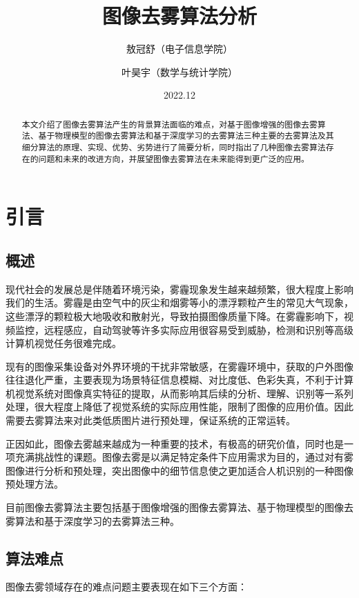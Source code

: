 \documentclass[12pt]{article}
\begin{document}
\title
{\bf\Large 图像去雾算法分析}
\date{\small 2022.12}
\author{\small 敖冠舒（电子信息学院） \and \small 叶昊宇（数学与统计学院）}
\maketitle

\thispagestyle{fancy}  

\begin{abstract}
本文介绍了图像去雾算法产生的背景算法面临的难点，对基于图像增强的图像去雾算法、基于物理模型的图像去雾算法和基于深度学习的去雾算法三种主要的去雾算法及其细分算法的原理、实现、优势、劣势进行了简要分析，同时指出了几种图像去雾算法存在的问题和未来的改进方向，并展望图像去雾算法在未来能得到更广泛的应用。
\end{abstract}

\section{引言}
\subsection{概述}

现代社会的发展总是伴随着环境污染，雾霾现象发生越来越频繁，很大程度上影响我们的生活。雾霾是由空气中的灰尘和烟雾等小的漂浮颗粒产生的常见大气现象，这些漂浮的颗粒极大地吸收和散射光，导致拍摄图像质量下降。在雾霾影响下，视频监控，远程感应，自动驾驶等许多实际应用很容易受到威胁，检测和识别等高级计算机视觉任务很难完成。

现有的图像采集设备对外界环境的干扰非常敏感，在雾霾环境中，获取的户外图像往往退化严重，主要表现为场景特征信息模糊、对比度低、色彩失真，不利于计算机视觉系统对图像真实特征的提取，从而影响其后续的分析、理解、识别等一系列处理，很大程度上降低了视觉系统的实际应用性能，限制了图像的应用价值。因此需要去雾算法来对此类低质图片进行预处理，保证系统的正常运转。

正因如此，图像去雾越来越成为一种重要的技术，有极高的研究价值，同时也是一项充满挑战性的课题。图像去雾是以满足特定条件下应用需求为目的，通过对有雾图像进行分析和预处理，突出图像中的细节信息使之更加适合人机识别的一种图像预处理方法。

目前图像去雾算法主要包括基于图像增强的图像去雾算法、基于物理模型的图像去雾算法和基于深度学习的去雾算法三种。

\subsection{算法难点}
图像去雾领域存在的难点问题主要表现在如下三个方面：
\end{document}
